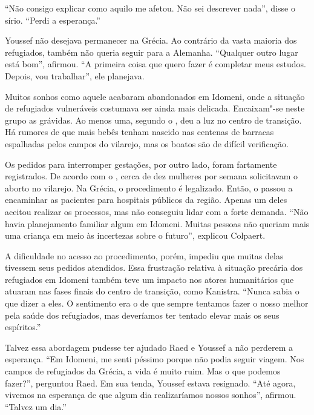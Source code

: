 ``Não consigo explicar como aquilo me afetou. Não sei descrever nada'',
disse o sírio. ``Perdi a esperança.''

Youssef não desejava permanecer na Grécia. Ao contrário da vasta maioria
dos refugiados, também não queria seguir para a Alemanha. ``Qualquer
outro lugar está bom'', afirmou. ``A primeira coisa que quero fazer é
completar meus estudos. Depois, vou trabalhar'', ele planejava.

Muitos sonhos como aquele acabaram abandonados em Idomeni, onde a
situação de refugiados vulneráveis costumava ser ainda mais delicada.
Encaixam"-se neste grupo as grávidas. Ao menos uma, segundo o , deu a
luz no centro de transição. Há rumores de que mais bebês tenham nascido
nas centenas de barracas espalhadas pelos campos do vilarejo, mas os
boatos são de difícil verificação.

Os pedidos para interromper gestações, por outro lado, foram fartamente
registrados. De acordo com o , cerca de dez mulheres por semana solicitavam o
aborto no vilarejo. Na Grécia, o procedimento é legalizado.
Então, o  passou a encaminhar as pacientes para hospitais públicos da
região. Apenas um deles aceitou realizar os processos, mas não conseguiu
lidar com a forte demanda. ``Não havia planejamento familiar algum em
Idomeni. Muitas pessoas não queriam mais uma criança em meio às
incertezas sobre o futuro'', explicou Colpaert.

A dificuldade no acesso ao procedimento, porém, impediu que muitas delas
tivessem seus pedidos atendidos. Essa frustração relativa à situação
precária dos refugiados em Idomeni também teve um impacto nos atores
humanitários que atuaram nas fases finais do centro de transição, como Kanistra.
``Nunca sabia o que dizer a eles. O sentimento
era o de que sempre tentamos fazer o nosso melhor pela saúde dos
refugiados, mas deveríamos ter tentado elevar mais os seus espíritos.''

Talvez essa abordagem pudesse ter ajudado Raed e Youssef a não perderem
a esperança. ``Em Idomeni, me senti péssimo porque não podia seguir
viagem. Nos campos de refugiados da Grécia, a vida é muito ruim. Mas o
que podemos fazer?'', perguntou Raed. Em sua tenda, Youssef estava
resignado. ``Até agora, vivemos na esperança de que algum dia
realizaríamos nossos sonhos'', afirmou. ``Talvez um dia.''

